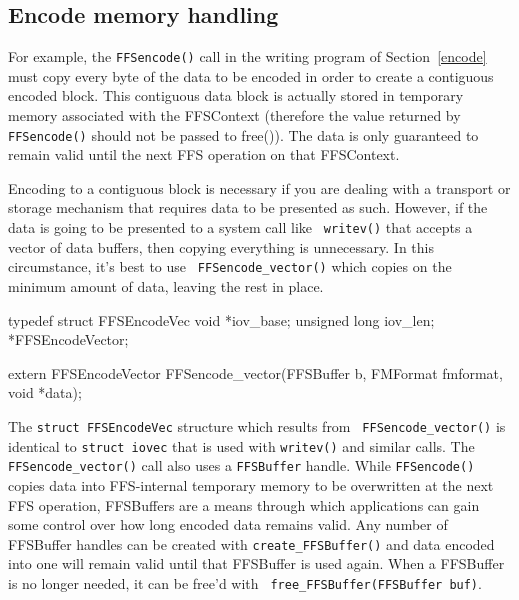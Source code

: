 \subsection{Encode memory handling}

For example, the {\tt FFSencode()} call in the writing program of
Section~\ref{encode} must copy every byte of the data to be encoded in order
to create a contiguous encoded block.  This contiguous data block is
actually stored in temporary memory associated with the FFSContext 
(therefore the value returned by {\tt FFSencode()} should not be passed to
free()).  The data is only guaranteed to remain valid until the next FFS
operation on that FFSContext.

Encoding to a contiguous block is necessary if you are dealing with a
transport or storage mechanism that requires data to be presented as such.
However, if the data is going to be presented to a system call like {\tt
  writev()} that accepts a vector of data buffers, then copying everything
is unnecessary.  In this circumstance, it's best to use {\tt
  FFSencode\_vector()} which copies on the minimum amount of data, leaving
the rest in place.  
\begin{Code}
typedef struct FFSEncodeVec {
    void *iov_base;
    unsigned long iov_len;
} *FFSEncodeVector;

extern FFSEncodeVector
FFSencode_vector(FFSBuffer b, FMFormat fmformat, void *data);
\end{Code}
The {\tt struct FFSEncodeVec} structure which results from {\tt
  FFSencode\_vector()} is identical to {\tt struct iovec} that is used with
{\tt writev()} and similar calls.  The {\tt FFSencode\_vector()} call also
uses a {\tt FFSBuffer} handle.  While {\tt FFSencode()} copies data into
FFS-internal temporary memory to be overwritten at the next FFS operation,
FFSBuffers are a means through which applications can gain some control over
how long encoded data remains valid.  Any number of
FFSBuffer handles can be created with {\tt create\_FFSBuffer()} and data
encoded into one will remain valid until that FFSBuffer is used again.  When
a FFSBuffer is no longer needed, it can be free'd with {\tt
  free\_FFSBuffer(FFSBuffer buf)}.

